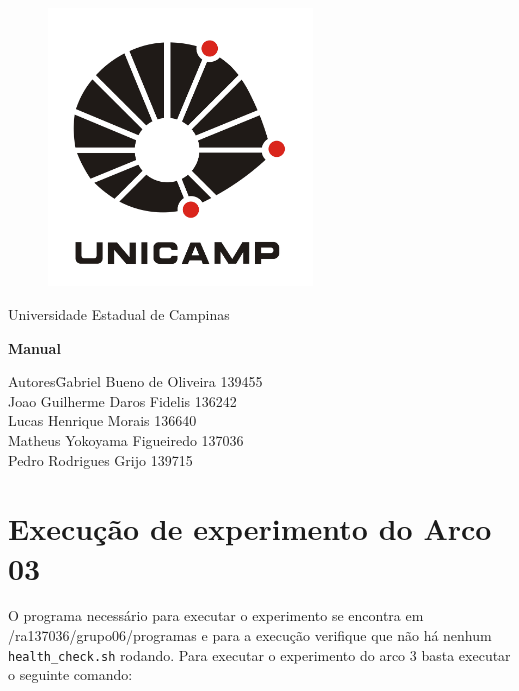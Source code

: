 \documentclass[a4paper,10pt]{article}
\date{\today}
\begin{document}
    \begin{titlepage}
        \begin{figure}
            \centering
          \includegraphics[width=7cm,keepaspectratio=true]{imagens/unicamp.png}

        \end{figure}
        \begin{center}
            \huge{Universidade Estadual de Campinas}

        \vfill
        \textbf{\LARGE{Manual}}
        \vfill
        \end{center}

        \begin{flushleft}
            \begin{tabbing}
                Autores\qquad\qquad\= Gabriel Bueno de Oliveira 139455 \\
                    \>Joao Guilherme Daros Fidelis 136242 \\
                    \>Lucas Henrique Morais 136640 \\
                    \>Matheus Yokoyama Figueiredo 137036\\
                    \>Pedro Rodrigues Grijo 139715\\
            \end{tabbing}
        \end{flushleft}
    \end{titlepage}

\newpage

\section{Execução de experimento do Arco 03}

        O programa necessário para executar o experimento se encontra em /ra137036/grupo06/programas e para a execução verifique que não há nenhum \verb|health_check.sh| rodando. Para executar o experimento do arco 3 basta executar o seguinte comando:
    
\end{document}
